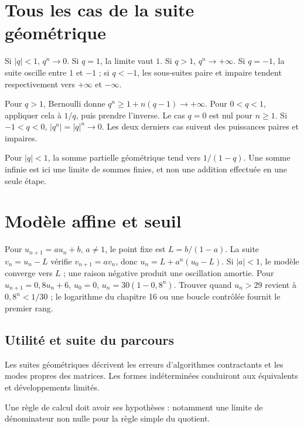 \documentclass[../cours_tle.tex]{subfiles}
\begin{document}
\section{Tous les cas de la suite géométrique}
\begin{theoreme}
Si $|q|<1$, $q^n\to0$. Si $q=1$, la limite vaut $1$. Si $q>1$, $q^n\to+\infty$.
Si $q=-1$, la suite oscille entre $1$ et $-1$ ; si $q<-1$, les sous-suites paire et impaire tendent respectivement vers $+\infty$ et $-\infty$.
\end{theoreme}
\begin{demonstration}
Pour $q>1$, Bernoulli donne $q^n\ge1+n(q-1)\to+\infty$.
Pour $0<q<1$, appliquer cela à $1/q$, puis prendre l'inverse.
Le cas $q=0$ est nul pour $n\ge1$. Si $-1<q<0$, $|q^n|=|q|^n\to0$.
Les deux derniers cas suivent des puissances paires et impaires.
\end{demonstration}
Pour $|q|<1$, la somme partielle géométrique tend vers $1/(1-q)$. Une somme infinie est ici une limite de sommes finies, et non une addition effectuée en une seule étape.
\section{Modèle affine et seuil}
Pour $u_{n+1}=au_n+b$, $a\ne1$, le point fixe est $L=b/(1-a)$.
La suite $v_n=u_n-L$ vérifie $v_{n+1}=av_n$, donc $u_n=L+a^n(u_0-L)$.
Si $|a|<1$, le modèle converge vers $L$ ; une raison négative produit une oscillation amortie.
Pour $u_{n+1}=0{,}8u_n+6$, $u_0=0$, $u_n=30(1-0{,}8^n)$.
Trouver quand $u_n>29$ revient à $0{,}8^n<1/30$ ; le logarithme du chapitre 16 ou une boucle contrôlée fournit le premier rang.
\begin{finchapitre}
\section{Utilité et suite du parcours}
Les suites géométriques décrivent les erreurs d'algorithmes contractants et les modes propres des matrices. Les formes indéterminées conduiront aux équivalents et développements limités.
\begin{retenir}
Une règle de calcul doit avoir ses hypothèses : notamment une limite de dénominateur non nulle pour la règle simple du quotient.
\end{retenir}
\end{finchapitre}
\end{document}

